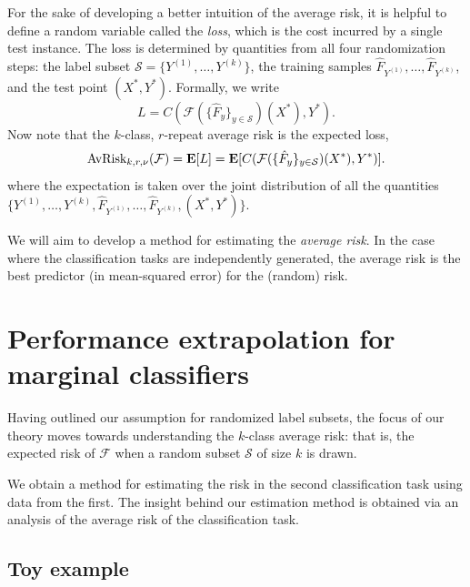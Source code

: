 \documentclass[12pt]{article}
\begin{document}
For the sake of developing a better intuition of the average risk, it
is helpful to define a random variable called the \emph{loss}, which
is the cost incurred by a single test instance.  The loss is
determined by quantities from all four randomization steps: the label
subset $\mathcal{S} = \{Y^{(1)},\hdots, Y^{(k)}\}$, the training samples
$\hat{F}_{Y^{(1)}},\hdots, \hat{F}_{Y^{(k)}}$, and the test point $(X^*, Y^*)$.
Formally, we write
\[
L = C(\mathcal{F}(\{\hat{F}_y\}_{y \in \mathcal{S}})(X^*), Y^*).
\]
Now note that the $k$-class, $r$-repeat average risk is the expected loss,
\begin{equation}\label{eq:avrisk_EL}
\text{AvRisk}_{k, r, \nu}(\mathcal{F}) = \textbf{E}[L] = \textbf{E}[C(\mathcal{F}(\{\hat{F}_y\}_{y \in \mathcal{S}})(X^*), Y^*)].
\end{equation}
where the expectation is taken over the joint distribution of all the
quantities $\{Y^{(1)},\hdots,
Y^{(k)}, \hat{F}_{Y^{(1)}},\hdots, \hat{F}_{Y^{(k)}}, (X^*, Y^*)\}$.

We will aim to develop a method for estimating the \emph{average
risk}.  In the case where the classification tasks are independently
generated, the average risk is the best predictor (in mean-squared
error) for the (random) risk.





\section{Performance extrapolation for marginal classifiers}

Having outlined our assumption for randomized label subsets, the focus
of our theory moves towards understanding the $k$-class average risk:
that is, the expected risk of $\mathcal{F}$ when a random subset
$\mathcal{S}$ of size $k$ is drawn.

We obtain a method for estimating the risk in the second
classification task using data from the first.  The insight behind our
estimation method is obtained via an analysis of the average risk of
the classification task.

\subsection{Toy example}
\end{document}
